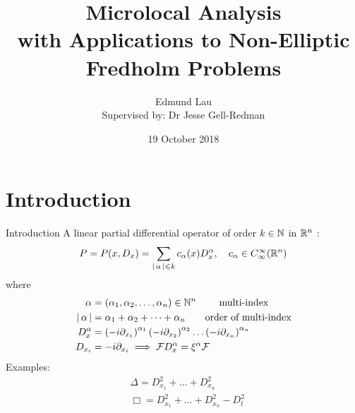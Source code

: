 \documentclass{beamer}
\title{Microlocal Analysis \\ 
    \large with Applications to Non-Elliptic Fredholm Problems}
\author{Edmund Lau \\
Supervised by: Dr Jesse Gell-Redman}
\institute[Unimelb] {
    The University of Melbourne \\ %
    \medskip
    \textit{elau1@student.unimelb.edu.au} %
}
\date{19 October 2018}
\begin{document}
    
\begin{frame}
\titlepage 
\end{frame}






\section{Introduction} 
\begin{frame}{Introduction}
A linear partial differential operator of order $k \in {\ensuremath {\mathbb N}}$ in ${\mathbb R}^n$ : 
\begin{equation*}
P = P(x, D_x) = \sum_{\left|\, \alpha\,\right| \leqslant k} c_\alpha(x) D^\alpha_x , \quad c_\alpha \in C^\infty_\infty({\mathbb R}^n)
\end{equation*}
where 
\begin{align*}
\alpha &= (\alpha_1, \alpha_2, \dots, \alpha_n) \in {\ensuremath {\mathbb N}}^n \tag*{ multi-index } \\
\left|\, \alpha\,\right| &= \alpha_1 + \alpha_2 + \dots + \alpha_n \tag*{order of multi-index} \\
D_x^\alpha & = \left(-i \partial_{x_1}\right)^{\alpha_1}\left(-i \partial_{x_2}\right)^{\alpha_2} \dots \left(-i \partial_{x_n}\right)^{\alpha_n} \\
D_{x_i} &= -i \partial_{x_i} \implies {\ensuremath {\cal F}} D_{x}^\alpha = \xi^\alpha {\ensuremath {\cal F}} 
\end{align*}
Examples: 
\begin{align*}
&\Delta = D_{x_1}^2  + \dots + D_{x_n}^2  \tag*{Laplace operator} \\
&\Box  = D_{x_1}^2  + \dots + D_{x_n}^2 - D_{t}^2    \tag*{Wave operator} 
\end{align*}
\end{frame} 
\end{document}

